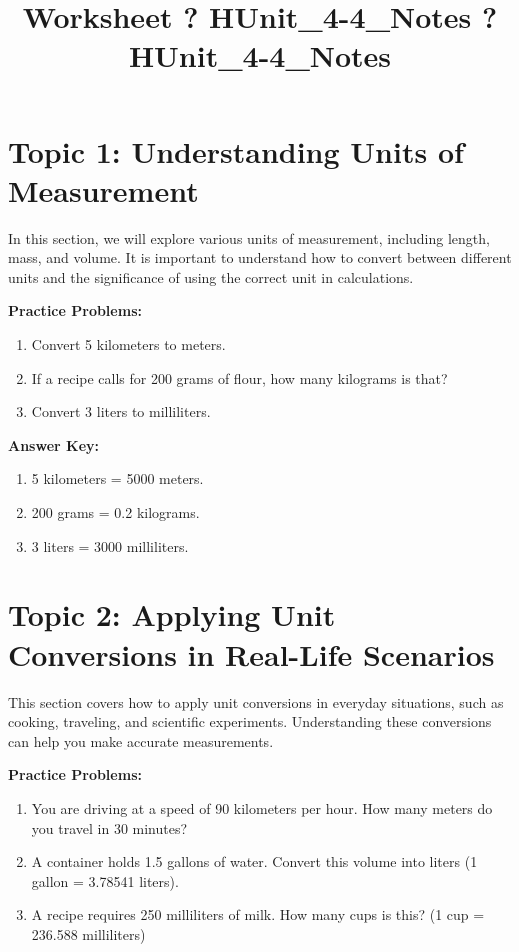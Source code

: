 \documentclass{article}
\title{Worksheet ? HUnit\_4-4\_Notes ? HUnit\_4-4\_Notes}
\author{}
\date{}
\begin{document}
\maketitle

\section*{Topic 1: Understanding Units of Measurement}
In this section, we will explore various units of measurement, including length, mass, and volume. It is important to understand how to convert between different units and the significance of using the correct unit in calculations.

\textbf{Practice Problems:}
\begin{enumerate}
    \item Convert 5 kilometers to meters.
    \item If a recipe calls for 200 grams of flour, how many kilograms is that?
    \item Convert 3 liters to milliliters.
\end{enumerate}

\textbf{Answer Key:}
\begin{enumerate}
    \item 5 kilometers = 5000 meters.
    \item 200 grams = 0.2 kilograms.
    \item 3 liters = 3000 milliliters.
\end{enumerate}

\section*{Topic 2: Applying Unit Conversions in Real-Life Scenarios}
This section covers how to apply unit conversions in everyday situations, such as cooking, traveling, and scientific experiments. Understanding these conversions can help you make accurate measurements.

\textbf{Practice Problems:}
\begin{enumerate}
    \item You are driving at a speed of 90 kilometers per hour. How many meters do you travel in 30 minutes?
    \item A container holds 1.5 gallons of water. Convert this volume into liters (1 gallon = 3.78541 liters).
    \item A recipe requires 250 milliliters of milk. How many cups is this? (1 cup = 236.588 milliliters)
\end{enumerate}
\end{document}
